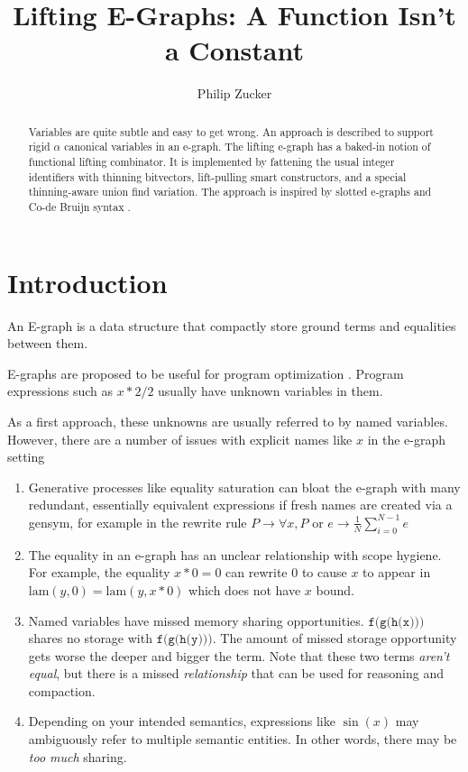 \documentclass{article}%
\begin{document}
\title{Lifting E-Graphs: A Function Isn't a Constant}

\author{Philip Zucker}

\maketitle
\begin{abstract}
Variables are quite subtle and easy to get wrong. An approach is described to support rigid $\alpha$ canonical variables in an e-graph. The lifting e-graph has a baked-in notion of functional lifting combinator. It is implemented by fattening the usual integer identifiers with thinning bitvectors, lift-pulling smart constructors, and a special thinning-aware union find variation. The approach is inspired by slotted e-graphs \cite{slotted} and Co-de Bruijn syntax \cite{McBride_2018}.
\end{abstract}

\section{Introduction}
An E-graph \cite{egg} is a data structure that compactly store ground terms and equalities between them.

E-graphs are proposed to be useful for program optimization \cite{PEG}. Program expressions such as  $x * 2 / 2$ usually have unknown variables in them.

As a first approach, these unknowns are usually referred to by named variables. However, there are a number of issues with explicit names like $x$ in the e-graph setting

\begin{enumerate}
\item Generative processes like equality saturation can bloat the e-graph with many redundant, essentially equivalent expressions if fresh names are created via a gensym, for example in the rewrite rule $P \rightarrow \forall x, P$ or $e \rightarrow \frac{1}{N} \sum_{i=0}^{N-1} e$
\item The equality in an e-graph has an unclear relationship with scope hygiene. For example, the equality $x * 0 = 0$ can rewrite $0$ to cause $x$ to appear in $\text{lam}(y, 0) = \text{lam}(y,x * 0)$ which does not have $x$ bound.
\item Named variables have missed memory sharing opportunities. $\texttt{f(g(h(x)))}$ shares no storage with $\texttt{f(g(h(y)))}$. The amount of missed storage opportunity gets worse the deeper and bigger the term. Note that these two terms \emph{aren't equal}, but there is a missed \emph{relationship} that can be used for reasoning and compaction.
\item Depending on your intended semantics, expressions like $\sin(x)$ may ambiguously refer to multiple semantic entities. In other words, there may be \emph{too much} sharing. 
\end{enumerate}
\end{document}
